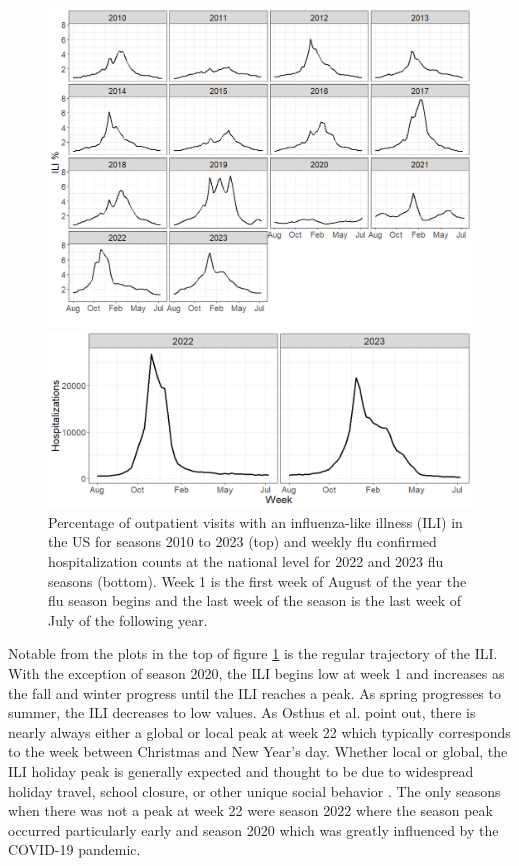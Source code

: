 \begin{figure}[hbt!]
    \centering
    \includegraphics[scale=.5]{Images/us_ili_seasons.png}
    
    \centering
    \includegraphics[scale=.42]{Images/us_hospitalizations.png}
    \caption{Percentage of outpatient visits with an influenza-like illness 
    (ILI) in the US for seasons 2010 to 2023 (top) and weekly flu confirmed 
    hospitalization counts at the national level for 2022 and 2023 flu seasons 
    (bottom). Week 1 is the first week of August of the year the flu season 
    begins and the last week of the season is the last week of July of the 
    following year.}
    \label{fig:us_ili}
\end{figure}

Notable from the plots in the top of figure \ref{fig:us_ili} is the regular 
trajectory of the ILI. With the exception of season 2020, the ILI begins low 
at week 1 and increases as the fall and winter progress until the ILI reaches 
a peak. As spring progresses to summer, the ILI decreases to low values. As 
Osthus et al. \cite[]{osthus2019dynamic} point out, there is nearly always 
either a global or local peak at week 22 which typically corresponds to the 
week between Christmas and New Year's day. 
Whether local or global, the ILI holiday peak is generally expected and thought 
to be due to widespread holiday travel, school closure, or other unique social 
behavior   
\cite[]{ewing2017contact, garza2013effect}.
The only seasons when there was not a peak at week 22 were season 2022 where 
the season peak occurred particularly early and season 2020 which was greatly 
influenced by the COVID-19 pandemic. 









